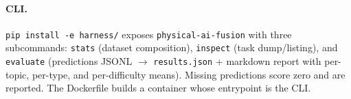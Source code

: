 \paragraph{CLI.}
\texttt{pip install -e harness/} exposes \texttt{physical-ai-fusion} with three subcommands: \texttt{stats} (dataset composition), \texttt{inspect} (task dump/listing), and \texttt{evaluate} (predictions JSONL $\to$ \texttt{results.json} + markdown report with per-topic, per-type, and per-difficulty means). Missing predictions score zero and are reported. The Dockerfile builds a container whose entrypoint is the CLI.

